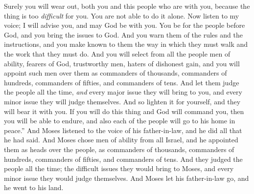 \begin{biblechapter}
\verse Surely you will wear out, both you and this people who are with you, because the thing is too \textit{difficult} for you. You are not able to do it alone.
\verse Now listen to my voice; I will advise you, and may God be with you. You be for the people before God, and you bring the issues to God.
\verse And you warn them of the rules and the instructions, and you make known to them the way in which they must walk and the work that they must do.
\verse And you will select from all the people men of ability, fearers of God, trustworthy men, haters of dishonest gain, and you will appoint such men over them as commanders of thousands, commanders of hundreds, commanders of fifties, and commanders of tens.
\verse And let them judge the people all the time, \textit{and} every major issue they will bring to you, and every minor issue they will judge themselves. And so lighten it for yourself, and they will bear it with you.
\verse If you will do this thing and God will command you, then you will be able to endure, and also each of the people will go to his home in peace.”
\verse And Moses listened to the voice of his father-in-law, and he did all that he had said.
\verse And Moses chose men of ability from all Israel, and he appointed them as heads over the people, as commanders of thousands, commanders of hundreds, commanders of fifties, and commanders of tens.
\verse And they judged the people all the time; the difficult issues they would bring to Moses, and every minor issue they would judge themselves.
\verse And Moses let his father-in-law go, and he went to his land.
\end{biblechapter}

